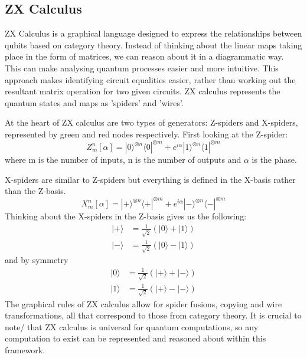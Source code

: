 \documentclass[12pt]{article}
\newcommand{\newp}
    {
    \vskip 0.5cm 
  }
\numberwithin{equation}{section}
\begin{document}
\subsection{ZX Calculus}
ZX Calculus is a graphical language designed to express the relationships between 
qubits based on category theory. Instead of thinking about the linear maps taking place
in the form of matrices, we can reason about it in a diagrammatic way. This 
can make analysing quantum processes easier and more intuitive. This approach 
makes identifying circuit equalities easier, rather than working out the resultant 
matrix operation for two given circuits. ZX calculus represents the quantum states 
and maps as 'spiders' and 'wires'. 
\newp 
At the heart of ZX calculus are two types of generators: Z-spiders and X-spiders,
represented by green and red nodes respectively. First looking at the Z-spider: 
\begin{equation}
  Z^n_m[\alpha] = |0\rangle^{\otimes n}\langle0|^{\otimes m}+e^{i\alpha}
  |1\rangle^{\otimes n}\langle1|^{\otimes m}
\end{equation}
where m is the number of inputs, n is the number of outputs and $\alpha$ is the 
phase.
\newp
X-spiders are similar to Z-spiders but everything is defined in the X-basis rather 
than the Z-basis. 
\begin{equation}
  X^n_m[\alpha] = |+\rangle^{\otimes n}\langle +|^{\otimes m}+e^{i\alpha}| -\rangle 
  ^{\otimes n}\langle - | ^{\otimes m}
\end{equation}
Thinking about the X-spiders in the Z-basis gives us the following: 
\begin{equation}
  \begin{split}
    |+\rangle &= \frac{1}{\sqrt2}(|0\rangle+|1\rangle)\\
    |-\rangle &= \frac{1}{\sqrt2}(|0\rangle-|1\rangle)
  \end{split}
\end{equation}
and by symmetry
\begin{equation}
  \begin{split}
    |0\rangle &= \frac{1}{\sqrt2}(|+\rangle+|-\rangle)\\
    |1\rangle &= \frac{1}{\sqrt2}(|+\rangle-|-\rangle)
  \end{split}
\end{equation}
The graphical rules of ZX calculus allow for spider fusions, copying and wire 
transformations, all that correspond to those from category theory. It is crucial 
to note/ that ZX calculus is universal for quantum computations, so any computation 
to exist can be represented and reasoned about within this framework. 
\end{document}
